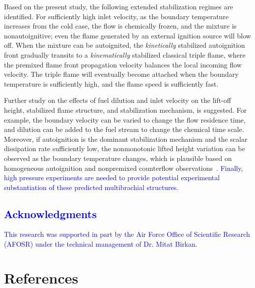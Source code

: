 \documentclass[review,3p,times]{elsarticle}
\begin{document}


Based on the present study, the following extended stabilization regimes are identified.  For sufficiently high inlet velocity, as the boundary temperature increases from the cold case, the flow is chemically frozen, and the mixture is nonautoignitive; even the flame generated by an external ignition source will blow off.  When the mixture can be autoignited, the \emph {kinetically} stabilized autoignition front gradually transits to a \emph {kinematically} stabilized classical triple flame, where the premixed flame front propagation velocity balances the local incoming flow velocity.  The triple flame will eventually become attached when the boundary temperature is sufficiently high, and the flame speed is sufficiently fast.

Further study on the effects of fuel dilution and inlet velocity on the lift-off height, stabilized flame structure, and stabilization mechanism, is suggested.  For example, the boundary velocity can be varied to change the flow residence time, and dilution can be added to the fuel stream to change the chemical time scale.  Moreover, if autoignition is the dominant stabilization mechanism and the scalar dissipation rate sufficiently low, the nonmonotonic lifted height variation can be observed as the boundary temperature changes, which is plausible based on homogeneous autoignition and nonpremixed counterflow observations~\cite{deng14}.  \textcolor{blue}{Finally, high pressure experiments are needed to provide potential experimental substantiation of these predicted multibrachial structures.}


\textcolor{blue}{\section*{Acknowledgments}
This research was supported in part by the Air Force Office of Scientific Research (AFOSR) under the technical management of Dr. Mitat Birkan.}


\section*{References}



\renewcommand{\thefigure}{\arabic{figure}}
\renewcommand{\thetable}{\arabic{table}}
\end{document}
